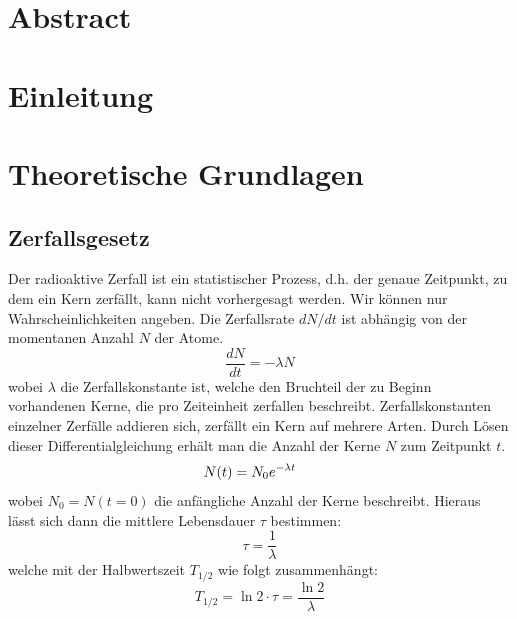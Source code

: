 \documentclass[12pt,listof=totoc]{scrartcl}
\title{\vspace{0cm}{\Huge Fortgeschrittenen-Praktikum I:\\ \vspace{1cm} Szintillationszähler}}
\author{Saskia Bondza\\Simon Stephan}
\date{durchgeführt am 12.10.2016 und 13.10.2016}
\begin{document}
\maketitle
\newpage

\section*{Abstract}



\newpage

\thispagestyle{empty}
\tableofcontents
\newpage

\section{Einleitung}




\newpage
\section{Theoretische Grundlagen}

\subsection{Zerfallsgesetz}\label{zerfallsgesetz}
Der radioaktive Zerfall ist ein statistischer Prozess, d.h. der genaue Zeitpunkt, zu dem ein Kern zerfällt, kann nicht vorhergesagt werden. Wir können nur Wahrscheinlichkeiten angeben. Die Zerfallsrate $dN/dt$ ist abhängig von der momentanen Anzahl $N$ der Atome.
\[\frac{dN}{dt}=-\lambda N\]
wobei $\lambda$ die Zerfallskonstante ist, welche den Bruchteil der zu Beginn vorhandenen Kerne, die pro Zeiteinheit zerfallen beschreibt. Zerfallskonstanten einzelner Zerfälle addieren sich, zerfällt ein Kern auf mehrere Arten. Durch Lösen dieser Differentialgleichung erhält man die Anzahl der Kerne $N$ zum Zeitpunkt $t$.
\[N(t)=N_0e^{-\lambda t}\hspace{0.5cm}\]
wobei $N_0=N(t=0)$ die anfängliche Anzahl der Kerne beschreibt. Hieraus lässt sich dann die mittlere Lebensdauer $\tau$ bestimmen:
\[\tau=\frac{1}{\lambda}\]
welche mit der Halbwertszeit $T_{1/2}$ wie folgt zusammenhängt:
\[T_{1/2} = \ln2\cdot \tau = \frac{\ln2}{\lambda}\]
\end{document}
